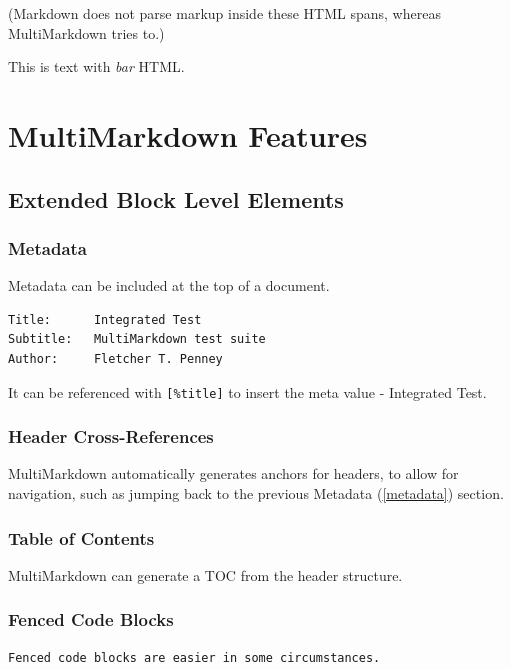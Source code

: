 (Markdown does not parse markup inside these HTML spans, whereas MultiMarkdown tries to.)

This is text with \emph{bar} HTML.

\part{MultiMarkdown Features}
\label{multimarkdownfeatures}

\chapter{Extended Block Level Elements}
\label{extendedblocklevelelements}

\section{Metadata}
\label{metadata}

Metadata can be included at the top of a document.

\begin{verbatim}
Title:		Integrated Test  
Subtitle:	MultiMarkdown test suite  
Author:		Fletcher T. Penney  
\end{verbatim}

It can be referenced with \texttt{[\%title]} to insert the meta value - Integrated Test.

\section{Header Cross-References}
\label{headercross-references}

MultiMarkdown automatically generates anchors for headers, to allow for navigation,
such as jumping back to the previous Metadata (\autoref{metadata}) section.

\section{Table of Contents}
\label{tableofcontents}

MultiMarkdown can generate a TOC from the header structure.

\tableofcontents

\section{Fenced Code Blocks}
\label{fencedcodeblocks}

\begin{verbatim}
Fenced code blocks are easier in some circumstances.
\end{verbatim}

